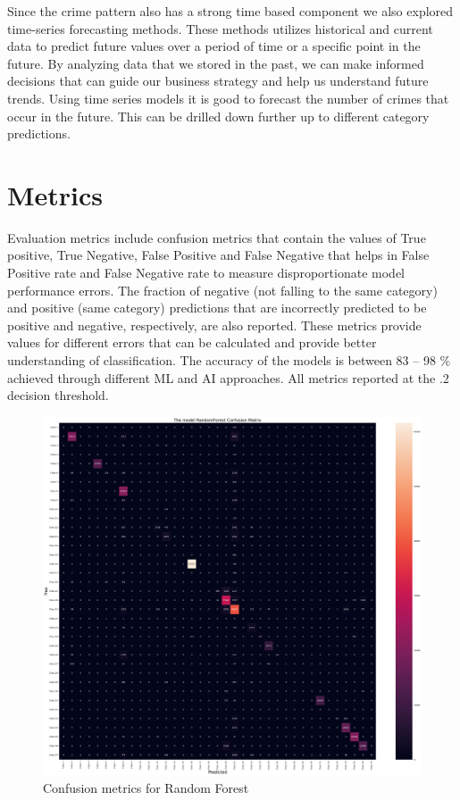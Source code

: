 \documentclass[conference,final,]{IEEEtran}
\begin{document}
Since the crime pattern also has a strong time based component we also
explored time-series forecasting methods. These methods utilizes
historical and current data to predict future values over a period of
time or a specific point in the future. By analyzing data that we stored
in the past, we can make informed decisions that can guide our business
strategy and help us understand future trends. Using time series models
it is good to forecast the number of crimes that occur in the future.
This can be drilled down further up to different category predictions.

\section{Metrics}\label{metrics}

Evaluation metrics include confusion metrics that contain the values of
True positive, True Negative, False Positive and False Negative that
helps in False Positive rate and False Negative rate to measure
disproportionate model performance errors. The fraction of negative (not
falling to the same category) and positive (same category) predictions
that are incorrectly predicted to be positive and negative,
respectively, are also reported. These metrics provide values for
different errors that can be calculated and provide better understanding
of classification. The accuracy of the models is between 83 -- 98 \%
achieved through different ML and AI approaches. All metrics reported at
the .2 decision threshold.

\begin{figure}

{\centering \includegraphics[width=0.7\linewidth]{img/fig12} 

}

\caption{Confusion metrics for Random Forest}\label{fig:unnamed-chunk-12}
\end{figure}
\end{document}

